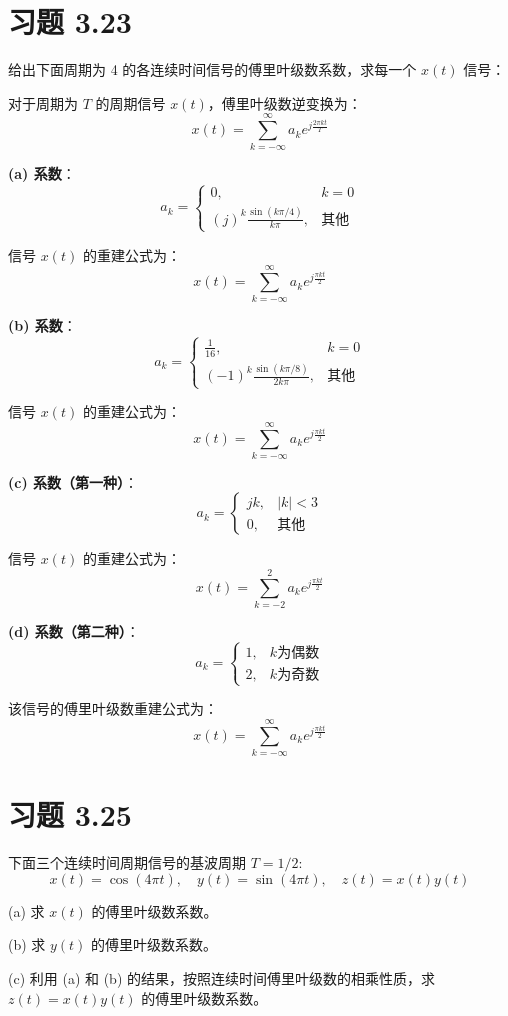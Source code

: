 \documentclass[UTF8]{report}
\theoremstyle{MyLineTheoremStyle} %
\theoremstyle{MyBlockTheoremStyle} %
\theoremstyle{MySubsubsectionStyle} %
\begin{document}
\section{习题 3.23}

给出下面周期为 4 的各连续时间信号的傅里叶级数系数，求每一个 \( x(t) \) 信号：

对于周期为 \( T \) 的周期信号 \( x(t) \)，傅里叶级数逆变换为：
\[
x(t) = \sum_{k=-\infty}^{\infty} a_k e^{j \frac{2 \pi k t}{T}}
\]

\textbf{(a) 系数}：
\[
a_k =
\begin{cases}
0, & k = 0 \\
(j)^k \frac{\sin(k \pi / 4)}{k \pi}, & \text{其他}
\end{cases}
\]

信号 \( x(t) \) 的重建公式为：
\[
x(t) = \sum_{k=-\infty}^{\infty} a_k e^{j \frac{\pi k t}{2}}
\]

\textbf{(b) 系数}：
\[
a_k = 
\begin{cases}
\frac{1}{16}, & k = 0 \\
(-1)^k \frac{\sin(k \pi / 8)}{2k \pi}, & \text{其他}
\end{cases}
\]

信号 \( x(t) \) 的重建公式为：
\[
x(t) = \sum_{k=-\infty}^{\infty} a_k e^{j \frac{\pi k t}{2}}
\]

\textbf{(c) 系数（第一种）}：
\[
a_k =
\begin{cases}
jk, & |k| < 3 \\
0, & \text{其他}
\end{cases}
\]

信号 \( x(t) \) 的重建公式为：
\[
x(t) = \sum_{k=-2}^{2} a_k e^{j \frac{\pi k t}{2}}
\]

\textbf{(d) 系数（第二种）}：
\[
a_k =
\begin{cases}
1, & k \text{为偶数} \\
2, & k \text{为奇数}
\end{cases}
\]

该信号的傅里叶级数重建公式为：
\[
x(t) = \sum_{k=-\infty}^{\infty} a_k e^{j \frac{\pi k t}{2}}
\]

\section{习题 3.25}

下面三个连续时间周期信号的基波周期 \( T = 1/2 \):
\[ x(t) = \cos(4\pi t), \quad y(t) = \sin(4\pi t), \quad z(t) = x(t)y(t) \]

(a) 求 \( x(t) \) 的傅里叶级数系数。\par
(b) 求 \( y(t) \) 的傅里叶级数系数。\par
(c) 利用 (a) 和 (b) 的结果，按照连续时间傅里叶级数的相乘性质，求 \( z(t) = x(t)y(t) \) 的傅里叶级数系数。\par
\end{document}
